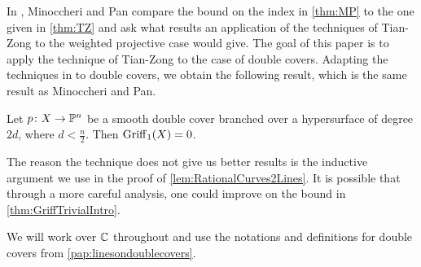 In \cite{MP}, Minoccheri and Pan compare the bound on the index in \cref{thm:MP} to the one given in \cref{thm:TZ} and ask what results an application of the techniques of Tian-Zong to the weighted projective case would give. The goal of this paper is to apply the technique of Tian-Zong to the case of double covers. Adapting the techniques in \cite{TZ} to double covers, we obtain the following result, which is the same result as Minoccheri and Pan.
\begin{theorem}
  \label{thm:GriffTrivialIntro}
  Let $p \colon X \to \mathbb{P}^n$ be a smooth double cover branched over a hypersurface of degree $2d$, where $d < \frac{n}{2}$. Then $\operatorname{Griff}_1(X) = 0$.
\end{theorem}
The reason the technique does not give us better results is the inductive argument we use in the proof of \cref{lem:RationalCurves2Lines}. It is possible that through a more careful analysis, one could improve on the bound in \cref{thm:GriffTrivialIntro}.

We will work over $\mathbb{C}$ throughout and use the notations and definitions for double covers from \cref{pap:linesondoublecovers}.






